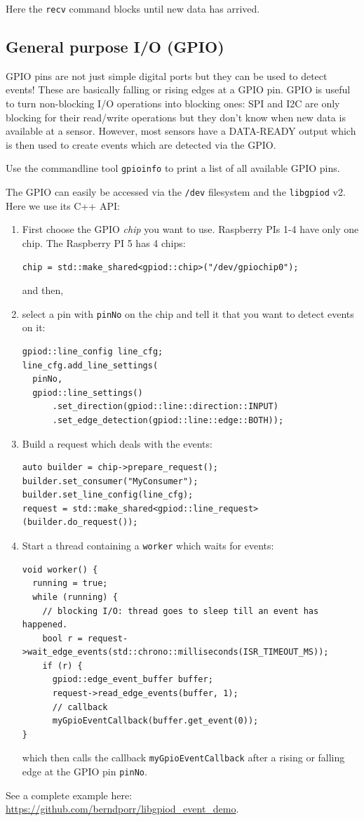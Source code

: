 \documentclass[12pt]{report}
\begin{document}
Here the \texttt{recv} command blocks until new data has arrived.





\subsection{General purpose I/O (GPIO)}
GPIO pins are not just simple digital ports but they
can be used to detect events! These are basically falling or rising edges at a GPIO pin.
GPIO is useful to turn non-blocking I/O operations into blocking ones:
SPI and I2C are only blocking for their read/write operations but they don't know
when new data is available at a sensor. However, most sensors have a DATA-READY output
which is then used to create events which are detected via the GPIO.

Use the commandline tool
\texttt{gpioinfo} to print a list of all available GPIO pins.

The GPIO can easily be accessed via
the \texttt{/dev} filesystem and the \texttt{libgpiod} v2. Here we use its C++ API:
\begin{enumerate}
\item First choose the GPIO \textsl{chip} you want to use. Raspberry PIs 1-4
  have only one chip. The Raspberry PI 5 has 4 chips:
\begin{verbatim}
chip = std::make_shared<gpiod::chip>("/dev/gpiochip0");
\end{verbatim}
and then,
\item select a pin with \texttt{pinNo} on the chip and tell it that you want to detect events on it:
\begin{verbatim}
gpiod::line_config line_cfg;
line_cfg.add_line_settings(
  pinNo,
  gpiod::line_settings()
      .set_direction(gpiod::line::direction::INPUT)
      .set_edge_detection(gpiod::line::edge::BOTH));
\end{verbatim}
\item Build a request which deals with the events:
\begin{verbatim}  
auto builder = chip->prepare_request();
builder.set_consumer("MyConsumer");
builder.set_line_config(line_cfg);
request = std::make_shared<gpiod::line_request>(builder.do_request());
\end{verbatim}
\item Start a thread containing a \texttt{worker} which waits for events:
\begin{verbatim}  
void worker() {
  running = true;
  while (running) {
    // blocking I/O: thread goes to sleep till an event has happened.
    bool r = request->wait_edge_events(std::chrono::milliseconds(ISR_TIMEOUT_MS));
    if (r) {
      gpiod::edge_event_buffer buffer;
      request->read_edge_events(buffer, 1);
      // callback
      myGpioEventCallback(buffer.get_event(0));
}
\end{verbatim}
which then calls the callback \texttt{myGpioEventCallback} after a rising or falling
edge at the GPIO pin \texttt{pinNo}.
\end{enumerate}
See a complete example here: \url{https://github.com/berndporr/libgpiod_event_demo}.
\end{document}
